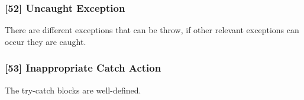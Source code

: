 \subsubsection{[52] Uncaught Exception}
There are different exceptions that can be throw, if other relevant exceptions can occur they are caught.

\subsubsection{[53] Inappropriate Catch Action}
The try-catch blocks are well-defined.
